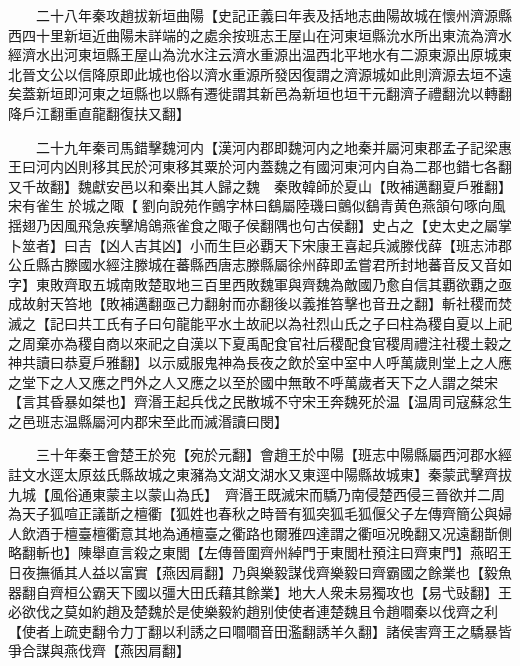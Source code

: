 　　二十八年秦攻趙拔新垣曲陽【史記正義曰年表及括地志曲陽故城在懷州濟源縣西四十里新垣近曲陽未詳端的之處余按班志王屋山在河東垣縣沇水所出東流為濟水經濟水出河東垣縣王屋山為沇水注云濟水重源出温西北平地水有二源東源出原城東北晉文公以信降原即此城也俗以濟水重源所發因復謂之濟源城如此則濟源去垣不遠矣蓋新垣即河東之垣縣也以縣有遷徙謂其新邑為新垣也垣干元翻濟子禮翻沇以轉翻降戶江翻重直龍翻復扶又翻】

　　二十九年秦司馬錯擊魏河内【漢河内郡即魏河内之地秦并屬河東郡孟子記梁惠王曰河内凶則移其民於河東移其粟於河内蓋魏之有國河東河内自為二郡也錯七各翻又千故翻】魏獻安邑以和秦出其人歸之魏　秦敗韓師於夏山【敗補邁翻夏戶雅翻】　宋有雀生於城之陬【劉向說苑作鸇字林曰鷂屬陸璣曰鸇似鷂青黄色燕頷句啄向風揺翅乃因風飛急疾擊鳩鴿燕雀食之陬子侯翻隅也句古侯翻】史占之【史太史之屬掌卜筮者】曰吉【凶人吉其凶】小而生巨必覇天下宋康王喜起兵滅滕伐薛【班志沛郡公丘縣古滕國水經注滕城在蕃縣西唐志滕縣屬徐州薛即孟嘗君所封地蕃音反又音如字】東敗齊取五城南敗楚取地三百里西敗魏軍與齊魏為敵國乃愈自信其覇欲覇之亟成故射天笞地【敗補邁翻亟己力翻射而亦翻後以義推笞擊也音丑之翻】斬社稷而焚滅之【記曰共工氏有子曰句龍能平水土故祀以為社烈山氏之子曰柱為稷自夏以上祀之周棄亦為稷自商以來祀之自漢以下夏禹配食官社后稷配食官稷周禮注社稷土穀之神共讀曰恭夏戶雅翻】以示威服鬼神為長夜之飲於室中室中人呼萬歲則堂上之人應之堂下之人又應之門外之人又應之以至於國中無敢不呼萬歲者天下之人謂之桀宋【言其昏暴如桀也】齊湣王起兵伐之民散城不守宋王奔魏死於温【温周司寇蘇忿生之邑班志温縣屬河内郡宋至此而滅湣讀曰閔】

　　三十年秦王會楚王於宛【宛於元翻】會趙王於中陽【班志中陽縣屬西河郡水經註文水逕太原兹氏縣故城之東瀦為文湖文湖水又東逕中陽縣故城東】秦蒙武擊齊拔九城【風俗通東蒙主以蒙山為氏】　齊湣王既滅宋而驕乃南侵楚西侵三晉欲并二周為天子狐喧正議斮之檀衢【狐姓也春秋之時晉有狐突狐毛狐偃父子左傳齊簡公與婦人飲酒于檀臺檀衢意其地為通檀臺之衢路也爾雅四達謂之衢咺况晚翻又况遠翻斮側略翻斬也】陳舉直言殺之東閭【左傳晉圍齊州綽門于東閭杜預注曰齊東門】燕昭王日夜撫循其人益以富實【燕因肩翻】乃與樂毅謀伐齊樂毅曰齊霸國之餘業也【毅魚器翻自齊桓公霸天下國以彊大田氏藉其餘業】地大人衆未易獨攻也【易弋䜴翻】王必欲伐之莫如約趙及楚魏於是使樂毅約趙别使使者連楚魏且令趙嚪秦以伐齊之利【使者上疏吏翻令力丁翻以利誘之曰嚪嚪音田濫翻誘羊久翻】諸侯害齊王之驕暴皆爭合謀與燕伐齊【燕因肩翻】

